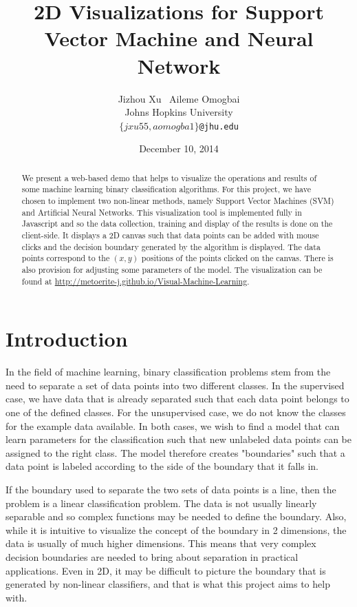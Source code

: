 \documentclass[11pt,letterpaper]{article}
\title{2D Visualizations for Support Vector Machine and Neural Network}
\author{Jizhou Xu \, Aileme Omogbai \\
	Johns Hopkins University \\
	{\tt $\{jxu55, aomogba1\}$@jhu.edu}}
\date{December 10, 2014}
\begin{document}
\maketitle
\begin{abstract}
We present a web-based demo that helps to visualize the operations and results of some machine learning binary classification algorithms. For this project, we have chosen to implement two non-linear methods, namely Support Vector Machines (SVM) and Artificial Neural Networks. This visualization tool is implemented fully in Javascript and so the data collection,  training  and display of the results is done on the client-side. It displays a 2D canvas such that data points can be added with mouse clicks and the decision boundary generated by the algorithm is displayed. The data points correspond to the $(x,y)$ positions of the points clicked on the canvas. There is also provision for adjusting some parameters of the model. The visualization can be found at \url{http://metoerite-j.github.io/Visual-Machine-Learning}.
\end{abstract}

\section{Introduction}

In the field of machine learning, binary classification problems stem from the need to separate a set of data points into two different classes. In the supervised case, we have data that is already separated such that each data point belongs to one of the defined classes. For the unsupervised case, we do not know the classes for the example data available. In both cases, we wish to find a model that can learn parameters for the classification such that new unlabeled data points can be assigned to the right class. The model therefore creates "boundaries" such that a data point is labeled according to the side of the boundary that it falls in. 

If the boundary used to separate the two sets of data points is a line, then the problem is a linear classification problem. The data is not usually linearly separable and so complex functions may be needed to define the boundary. Also, while it is intuitive to visualize the concept of the boundary in 2 dimensions, the data is usually of much higher dimensions. This means that very complex decision boundaries are needed to bring about separation in practical applications. Even in 2D, it may be difficult to picture the boundary that is generated by non-linear classifiers, and that is what this project aims to help with.
\end{document}
